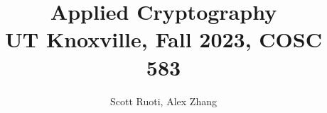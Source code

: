\documentclass[math,code]{amznotes}
\title{\textbf{Applied Cryptography}\\
\large UT Knoxville, Fall 2023, COSC 583}
\author{Scott Ruoti, Alex Zhang}
\begin{document}
\maketitle
\tableofcontents




\amzindex
\end{document}
